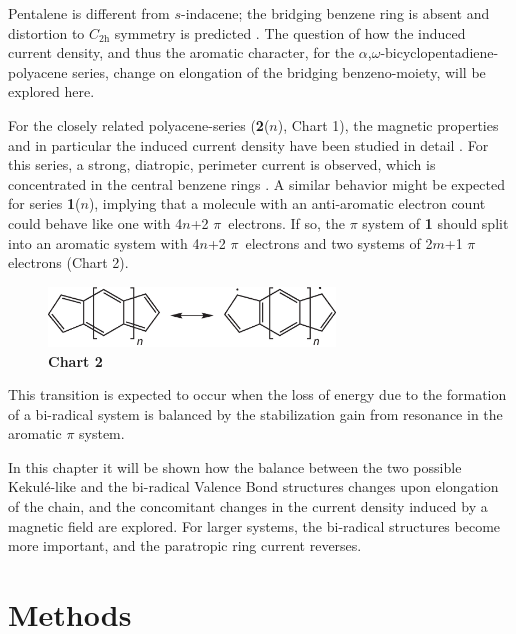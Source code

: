 Pentalene is different from $s$-indacene; the bridging benzene ring is absent and distortion to $C_\mathrm{2h}$ symmetry is predicted  \cite{r16,r17}. The question of how the induced current density, and thus the aromatic character, for the $\alpha$,$\omega$-bicyclopentadiene-polyacene series, change on elongation of the bridging benzeno-moiety, will be explored here.

For the closely related polyacene-series (\textbf{2}($n$), Chart 1), the magnetic properties and in particular the induced current density have been studied in detail  \cite{r18,r19}. For this series, a strong, diatropic, perimeter current is observed, which is concentrated in the central benzene rings  \cite{r18}. A similar behavior might be expected for series \textbf{1}($n$), implying that a molecule with an anti-aromatic electron count could behave like one with 4$n$+2 \mbox{$\pi$ electrons}. If so, the $\pi$ system of \textbf{1} should split into an aromatic system with 4$n$+2 \mbox{$\pi$ electrons} and two systems of 2$m$+1 $\pi$ electrons (Chart 2).
\begin{figure}[htdp]
\center
\includegraphics[width=3in]{indacene/figures/chart2.eps}\\
\textbf{Chart 2}
\end{figure}
This transition is expected to occur when the loss of energy due to the formation of a bi-radical system is balanced by the stabilization gain from resonance in the aromatic $\pi$ system.

In this chapter it will be shown how the balance between the two possible Kekul\'e-like and the bi-radical Valence Bond structures changes upon elongation of the chain, and the
concomitant changes in the current density induced by a magnetic field are explored. For larger systems, the bi-radical structures become more important, and the paratropic ring current reverses.

\section{Methods}

